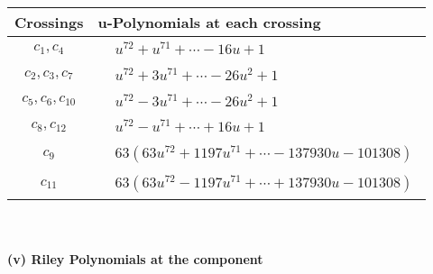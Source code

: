 \documentclass[1p]{elsarticle_modified}
\theoremstyle{definition}
\begin{document}
\begin{tabular}{m{50pt}|m{274pt}}
Crossings & \hspace{64pt}u-Polynomials at each crossing \\
\hline $$\begin{aligned}c_{1},c_{4}\end{aligned}$$&$\begin{aligned}
&u^{72}+u^{71}+\cdots-16 u+1
\end{aligned}$\\
\hline $$\begin{aligned}c_{2},c_{3},c_{7}\end{aligned}$$&$\begin{aligned}
&u^{72}+3 u^{71}+\cdots-26 u^2+1
\end{aligned}$\\
\hline $$\begin{aligned}c_{5},c_{6},c_{10}\end{aligned}$$&$\begin{aligned}
&u^{72}-3 u^{71}+\cdots-26 u^2+1
\end{aligned}$\\
\hline $$\begin{aligned}c_{8},c_{12}\end{aligned}$$&$\begin{aligned}
&u^{72}- u^{71}+\cdots+16 u+1
\end{aligned}$\\
\hline $$\begin{aligned}c_{9}\end{aligned}$$&$\begin{aligned}
&63(63 u^{72}+1197 u^{71}+\cdots-137930 u-101308)
\end{aligned}$\\
\hline $$\begin{aligned}c_{11}\end{aligned}$$&$\begin{aligned}
&63(63 u^{72}-1197 u^{71}+\cdots+137930 u-101308)
\end{aligned}$\\
\hline
\end{tabular}\\~\\
\newpage\renewcommand{\arraystretch}{1}
\flushleft \textbf{(v) Riley Polynomials at the component}\newline \\
\end{document}
